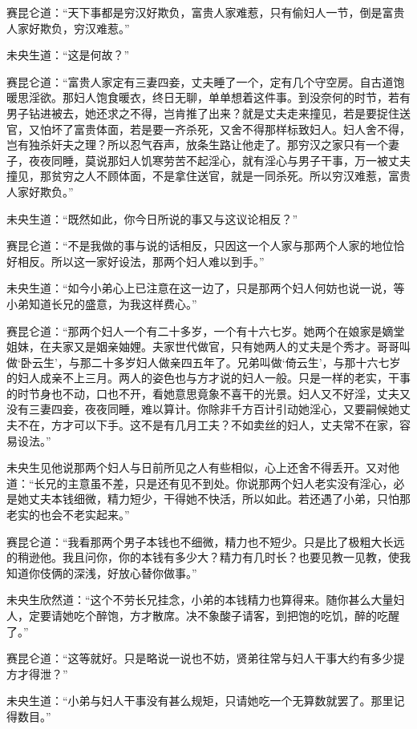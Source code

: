 \documentclass[a4paper,12pt,UTF8,twoside]{ctexbook}
\begin{document}
赛昆仑道：“天下事都是穷汉好欺负，富贵人家难惹，只有偷妇人一节，倒是富贵人家好欺负，穷汉难惹。”

未央生道：“这是何故？”

赛昆仑道：“富贵人家定有三妻四妾，丈夫睡了一个，定有几个守空房。自古道饱暖思淫欲。那妇人饱食暖衣，终日无聊，单单想着这件事。到没奈何的时节，若有男子钻进被去，她还求之不得，岂肯推了出来？就是丈夫走来撞见，若是要捉住送官，又怕坏了富贵体面，若是要一齐杀死，又舍不得那样标致妇人。妇人舍不得，岂有独杀奸夫之理？所以忍气吞声，放条生路让他走了。那穷汉之家只有一个妻子，夜夜同睡，莫说那妇人饥寒劳苦不起淫心，就有淫心与男子干事，万一被丈夫撞见，那贫穷之人不顾体面，不是拿住送官，就是一同杀死。所以穷汉难惹，富贵人家好欺负。”

未央生道：“既然如此，你今日所说的事又与这议论相反？”

赛昆仑道：“不是我做的事与说的话相反，只因这一个人家与那两个人家的地位恰好相反。所以这一家好设法，那两个妇人难以到手。”

未央生道：“如今小弟心上已注意在这一边了，只是那两个妇人何妨也说一说，等小弟知道长兄的盛意，为我这样费心。”

赛昆仑道：“那两个妇人一个有二十多岁，一个有十六七岁。她两个在娘家是嫡堂姐妹，在夫家又是姻亲妯娌。夫家世代做官，只有她两人的丈夫是个秀才。哥哥叫做‘卧云生’，与那二十多岁妇人做亲四五年了。兄弟叫做‘倚云生’，与那十六七岁的妇人成亲不上三月。两人的姿色也与方才说的妇人一般。只是一样的老实，干事的时节身也不动，口也不开，看她意思竟象不喜干的光景。妇人又不好淫，丈夫又没有三妻四妾，夜夜同睡，难以算计。你除非千方百计引动她淫心，又要嗣候她丈夫不在，方才可以下手。这不是有几月工夫？不如卖丝的妇人，丈夫常不在家，容易设法。”

未央生见他说那两个妇人与日前所见之人有些相似，心上还舍不得丢开。又对他道：“长兄的主意虽不差，只是还有见不到处。你说那两个妇人老实没有淫心，必是她丈夫本钱细微，精力短少，干得她不快活，所以如此。若还遇了小弟，只怕那老实的也会不老实起来。”

赛昆仑道：“我看那两个男子本钱也不细微，精力也不短少。只是比了极粗大长远的稍逊他。我且问你，你的本钱有多少大？精力有几时长？也要见教一见教，使我知道你伎俩的深浅，好放心替你做事。”

未央生欣然道：“这个不劳长兄挂念，小弟的本钱精力也算得来。随你甚么大量妇人，定要请她吃个醉饱，方才散席。决不象酸子请客，到把饱的吃饥，醉的吃醒了。”

赛昆仑道：“这等就好。只是略说一说也不妨，贤弟往常与妇人干事大约有多少提方才得泄？”

未央生道：“小弟与妇人干事没有甚么规矩，只请她吃一个无算数就罢了。那里记得数目。”
\end{document}
